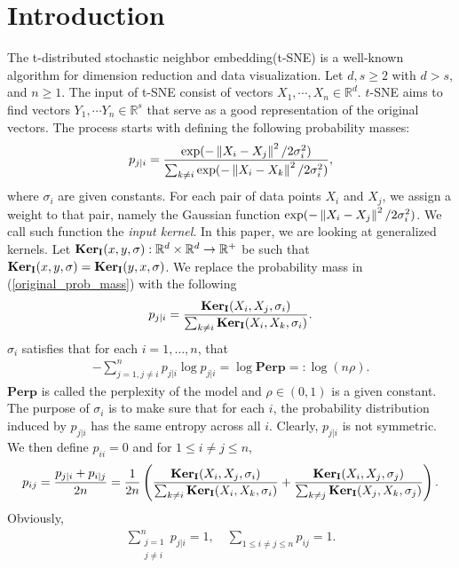 \section{Introduction} \label{sec_intro}
The t-distributed stochastic neighbor embedding(t-SNE) is a well-known
algorithm for dimension reduction and data visualization. Let $d,s \geq 2$ with
$d>s$, and $n \geq 1$. The input of t-SNE consist of vectors $X_1, \cdots, X_n
    \in \mathbb{R}^d$. $t$-SNE aims to find vectors $Y_1, \cdots Y_n \in
    \mathbb{R}^s$ that serve as a good representation of the original vectors. The
process starts with defining the following probability masses:
\begin{align} \label{original_prob_mass}
    p_{j|i} = \frac{\exp(-\left\lVert X_i-X_j\right\rVert^2/2\sigma_i^2)}{\sum_{k \neq i} \exp(-\left\lVert X_i-X_k\right\rVert^2/2\sigma_i^2)},
\end{align}
where $\sigma_i$ are given constants. For each pair of data points $X_i$ and $X_j$, we assign a weight to that pair, namely the Gaussian function $\exp(-\left\lVert X_i-X_j\right\rVert^2/2\sigma_i^2)$. We call such function the \textit{input kernel}. In this paper, we are looking at generalized kernels. Let $\mathbf{Ker}_{\mathbf{I}}(x,y,\sigma): \mathbb{R}^d  \times \mathbb{R}^d \to \mathbb{R}^+$ be such that $\mathbf{Ker}_{\mathbf{I}}(x,y,\sigma)=\mathbf{Ker}_{\mathbf{I}}(y,x,\sigma)$. We replace the probability mass in (\ref{original_prob_mass}) with the following
\begin{align}
    p_{j|i} = \frac{\mathbf{Ker}_{\mathbf{I}}(X_i,X_j,\sigma_i)}{\sum_{k \neq i} \mathbf{Ker}_{\mathbf{I}}(X_i,X_k,\sigma_i)}.
\end{align}
$\sigma_i$ satisfies that for each $i = 1, \dots, n$, that
\begin{align}
    -\sum_{j = 1, j \neq i}^n p_{j|i} \log p_{j|i} = \log \textbf{Perp} =: \log (n \rho).
\end{align}
$\textbf{Perp}$ is called the perplexity of the model and $\rho \in (0,1)$ is a given constant. The purpose of $\sigma_i$ is to make sure that for each $i$, the probability distribution induced by $p_{j|i}$ has the same entropy across all $i$. Clearly, $p_{j|i}$ is not symmetric. We then define $p_{ii} = 0$ and for $1 \leq i \neq j \leq n$,
\begin{align}
    p_{ij} = \frac{p_{j|i} + p_{i|j}}{2n} = \frac{1}{2n}\left(\frac{\mathbf{Ker}_{\mathbf{I}}(X_i,X_j,\sigma_i)}{\sum_{k \neq i} \mathbf{Ker}_{\mathbf{I}}(X_i,X_k,\sigma_i)}+\frac{\mathbf{Ker}_{\mathbf{I}}(X_i,X_j,\sigma_j)}{\sum_{k \neq j} \mathbf{Ker}_{\mathbf{I}}(X_j,X_k,\sigma_j)}\right).
\end{align}
Obviously,
\begin{align}
    \sum_{\substack{j = 1 \\ j \neq i}}^n p_{j|i} = 1, \quad \sum_{1 \leq i \neq j \leq n} p_{ij} = 1.
\end{align}
